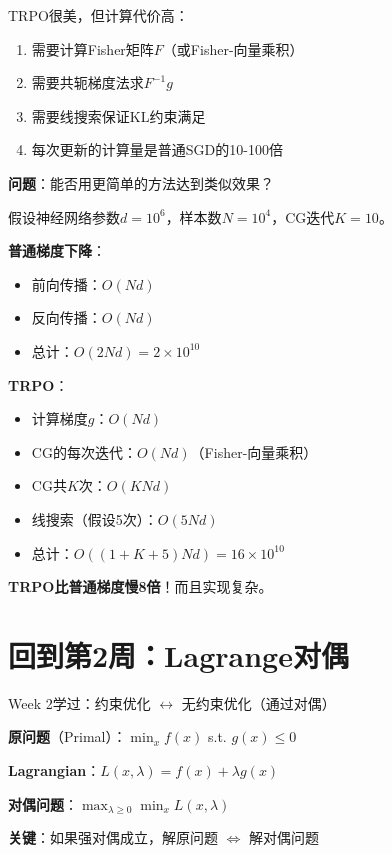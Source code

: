 \documentclass[11pt,a4paper]{article}
\theoremstyle{definition}
\begin{document}
\begin{keypoint}[TRPO的问题]
TRPO很美，但计算代价高：
\begin{enumerate}
    \item 需要计算Fisher矩阵$F$（或Fisher-向量乘积）
    \item 需要共轭梯度法求$F^{-1}g$
    \item 需要线搜索保证KL约束满足
    \item 每次更新的计算量是普通SGD的10-100倍
\end{enumerate}

\textbf{问题}：能否用更简单的方法达到类似效果？
\end{keypoint}

\begin{calculation}[TRPO的计算代价]
假设神经网络参数$d = 10^6$，样本数$N = 10^4$，CG迭代$K = 10$。

\textbf{普通梯度下降}：
\begin{itemize}
    \item 前向传播：$O(Nd)$
    \item 反向传播：$O(Nd)$
    \item 总计：$O(2Nd) = 2 \times 10^{10}$
\end{itemize}

\textbf{TRPO}：
\begin{itemize}
    \item 计算梯度$g$：$O(Nd)$
    \item CG的每次迭代：$O(Nd)$（Fisher-向量乘积）
    \item CG共$K$次：$O(KNd)$
    \item 线搜索（假设5次）：$O(5Nd)$
    \item 总计：$O((1 + K + 5)Nd) = 16 \times 10^{10}$
\end{itemize}

\textbf{TRPO比普通梯度慢8倍}！而且实现复杂。
\end{calculation}

\section{回到第2周：Lagrange对偶}

\begin{plainwords}[核心思想回顾]
Week 2学过：约束优化 $\leftrightarrow$ 无约束优化（通过对偶）

\textbf{原问题}（Primal）：$\min_x f(x)$ s.t. $g(x) \leq 0$

\textbf{Lagrangian}：$L(x, \lambda) = f(x) + \lambda g(x)$

\textbf{对偶问题}：$\max_{\lambda \geq 0} \min_x L(x, \lambda)$

\textbf{关键}：如果强对偶成立，解原问题 $\Leftrightarrow$ 解对偶问题
\end{plainwords}
\end{document}
